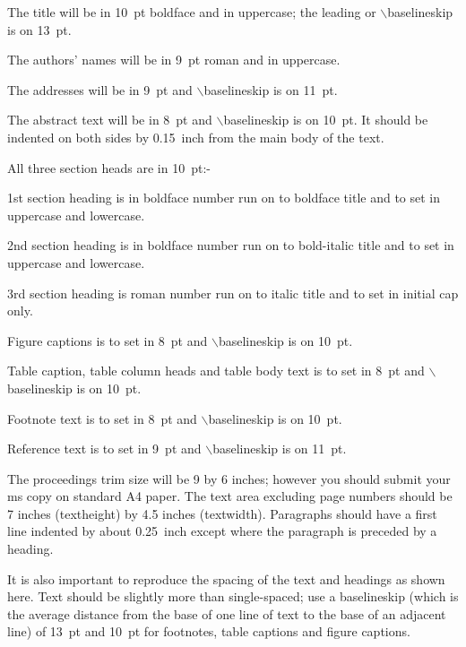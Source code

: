 \documentclass{ws-procs9x6}
\begin{document}
\begin{romanlist}
\item The title will be in 10~pt boldface and in uppercase; the leading or 
$\backslash$baselineskip is on 13~pt. 

\item The authors' names will be in 9~pt roman and in uppercase. 

\item The addresses will be in 9~pt and $\backslash$baselineskip  
is on 11~pt. 

\item The abstract text will be in 8~pt and $\backslash$baselineskip is 
on 10~pt.  It should be indented on both sides by 0.15~inch from 
the main body of the text.

\item All three section heads are in 10~pt:- 

\noindent
1st section heading is in boldface number run on to boldface
title and to set in uppercase and lowercase.
\eject

\noindent
2nd section heading is in boldface number run on to bold-italic
title and to set in uppercase and lowercase.

\noindent
3rd section heading is roman number run on to italic title and
to set in initial cap only.

\item Figure captions is to set in 8~pt and $\backslash$baselineskip 
is on 10~pt.

\item Table caption, table column heads and table body text 
is to set in 8~pt and $\backslash$baselineskip is on 10~pt. 

\item Footnote text is to set in 8~pt and $\backslash$baselineskip 
is on 10~pt.

\item Reference text is to set in 9~pt and $\backslash$baselineskip 
is on 11~pt.

\end{romanlist}

The proceedings trim size will be 9 by 6 inches; however you
should submit your ms copy on standard A4 paper.  The text area 
excluding page numbers should be 7 inches (textheight) by 
4.5 inches (textwidth).  Paragraphs should have a first line indented 
by about 0.25~inch except where the paragraph is preceded by a heading.

It is also important to reproduce the spacing of the text and
headings as shown here. Text should be slightly more than
single-spaced; use a baselineskip (which is the average 
distance from the base of one line of text to the base of 
an adjacent line) of 13~pt and 10~pt for footnotes, table captions 
and figure captions.
\end{document}
